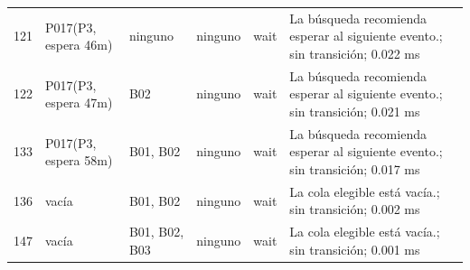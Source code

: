 \begin{longtable}{r p{3.0cm} p{1.25cm} p{2.7cm} p{2.0cm} p{2.4cm}}
121 & P017(P3, espera 46m) & ninguno & ninguno & wait & La búsqueda recomienda esperar al siguiente evento.; sin transición; 0.022 ms \\
122 & P017(P3, espera 47m) & B02 & ninguno & wait & La búsqueda recomienda esperar al siguiente evento.; sin transición; 0.021 ms \\
133 & P017(P3, espera 58m) & B01, B02 & ninguno & wait & La búsqueda recomienda esperar al siguiente evento.; sin transición; 0.017 ms \\
136 & vacía & B01, B02 & ninguno & wait & La cola elegible está vacía.; sin transición; 0.002 ms \\
147 & vacía & B01, B02, B03 & ninguno & wait & La cola elegible está vacía.; sin transición; 0.001 ms \\
\bottomrule
\end{longtable}

